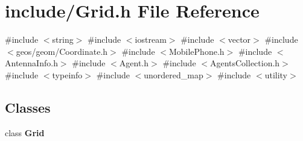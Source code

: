 \section{include/\+Grid.h File Reference}
\label{_grid_8h}
{\ttfamily \#include $<$string$>$}\newline
{\ttfamily \#include $<$iostream$>$}\newline
{\ttfamily \#include $<$vector$>$}\newline
{\ttfamily \#include $<$geos/geom/\+Coordinate.\+h$>$}\newline
{\ttfamily \#include $<$Mobile\+Phone.\+h$>$}\newline
{\ttfamily \#include $<$Antenna\+Info.\+h$>$}\newline
{\ttfamily \#include $<$Agent.\+h$>$}\newline
{\ttfamily \#include $<$Agents\+Collection.\+h$>$}\newline
{\ttfamily \#include $<$typeinfo$>$}\newline
{\ttfamily \#include $<$unordered\+\_\+map$>$}\newline
{\ttfamily \#include $<$utility$>$}\newline
\subsection*{Classes}
\begin{DoxyCompactItemize}
\item 
class \textbf{ Grid}
\end{DoxyCompactItemize}
